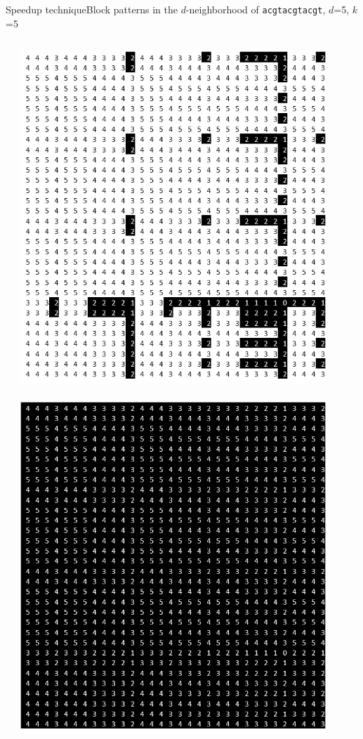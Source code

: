 \documentclass[pdf,xcolor={dvipsnames}]{beamer}
\begin{document}
\begin{frame}{Speedup technique}{Block patterns in the $d$-neighborhood of \texttt{acgtacgtacgt}, $d$=5, $k$=5}
\begin{columns}
\begin{column}{0.33\textwidth}
			\end{column}
			\begin{column}{0.33\textwidth}
				\includegraphics[width=0.9\textwidth]{img/2.png}\\\ \\
				\includegraphics[width=0.9\textwidth]{img/5.png}
			\end{column}
		\end{columns}
	\end{frame}
\end{document}
